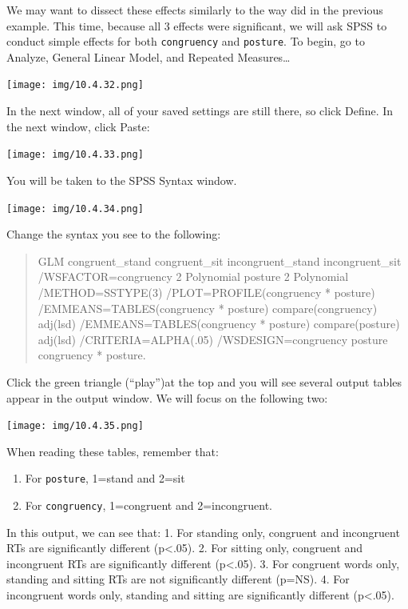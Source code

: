 \documentclass[]{book}
\providecommand{\tightlist}{%
  \setlength{\itemsep}{0pt}\setlength{\parskip}{0pt}}
\begin{document}
We may want to dissect these effects similarly to the way did in the
previous example. This time, because all 3 effects were significant, we
will ask SPSS to conduct simple effects for both \texttt{congruency} and
\texttt{posture}. To begin, go to {Analyze}, {General Linear Model}, and
{Repeated Measures\ldots{}}

\texttt{[image: img/10.4.32.png]}

In the next window, all of your saved settings are still there, so click
{Define}. In the next window, click {Paste}:

\texttt{[image: img/10.4.33.png]}

You will be taken to the SPSS Syntax window.

\texttt{[image: img/10.4.34.png]}

Change the syntax you see to the following:

\begin{quote}
GLM congruent\_stand congruent\_sit incongruent\_stand incongruent\_sit
/WSFACTOR=congruency 2 Polynomial posture 2 Polynomial /METHOD=SSTYPE(3)
/PLOT=PROFILE(congruency * posture) /EMMEANS=TABLES(congruency *
posture) compare(congruency) adj(lsd) /EMMEANS=TABLES(congruency *
posture) compare(posture) adj(lsd) /CRITERIA=ALPHA(.05)
/WSDESIGN=congruency posture congruency * posture.
\end{quote}

Click the green triangle ({``play''})at the top and you will see several
output tables appear in the output window. We will focus on the
following two:

\texttt{[image: img/10.4.35.png]}

When reading these tables, remember that:

\begin{enumerate}
\def\labelenumi{\arabic{enumi}.}
\tightlist
\item
  For \texttt{posture}, 1=stand and 2=sit
\item
  For \texttt{congruency}, 1=congruent and 2=incongruent.
\end{enumerate}

In this output, we can see that: 1. For standing only, congruent and
incongruent RTs are significantly different (p\textless{}.05). 2. For
sitting only, congruent and incongruent RTs are significantly different
(p\textless{}.05). 3. For congruent words only, standing and sitting RTs
are not significantly different (p=NS). 4. For incongruent words only,
standing and sitting are significantly different (p\textless{}.05).
\end{document}
